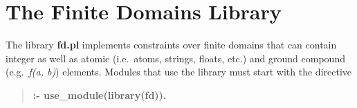 %
% 
% 
% 
% 
%
%
%

\addtocounter{secnumdepth}{2}
\chapter{The Finite Domains Library}
\label{chapdomains}

The library {\bf fd.pl}
implements constraints over finite domains that can contain
integer as well as atomic (i.e.\ atoms, strings, floats, etc.)
and ground compound (e.g.\ {\it f(a, b)})
elements.
Modules that use the library must start with the directive
\begin{quote}
{\bf :- use_module(library(fd)).}
\end{quote}

